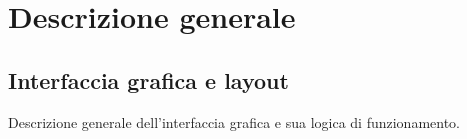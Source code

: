 \section{Descrizione generale}

\subsection{Interfaccia grafica e layout}
Descrizione generale dell'interfaccia grafica e sua logica di funzionamento.

